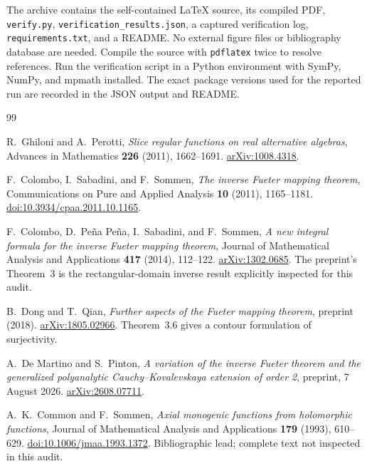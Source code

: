 \documentclass[11pt,a4paper]{article}
\numberwithin{equation}{section}
\theoremstyle{definition}
\theoremstyle{remark}
\begin{document}
The archive contains the self-contained LaTeX source, its compiled PDF,
\texttt{verify.py}, \texttt{verification\_results.json}, a captured
verification log, \texttt{requirements.txt}, and a README. No external
figure files or bibliography database are needed. Compile the source
with \texttt{pdflatex} twice to resolve references. Run the verification
script in a Python environment with SymPy, NumPy, and mpmath installed.
The exact package versions used for the reported run are recorded in
the JSON output and README.

\begin{thebibliography}{99}

R.~Ghiloni and A.~Perotti,
\emph{Slice regular functions on real alternative algebras},
Advances in Mathematics \textbf{226} (2011), 1662--1691.
\href{https://arxiv.org/abs/1008.4318}{arXiv:1008.4318}.

F.~Colombo, I.~Sabadini, and F.~Sommen,
\emph{The inverse Fueter mapping theorem},
Communications on Pure and Applied Analysis \textbf{10} (2011), 1165--1181.
\href{https://doi.org/10.3934/cpaa.2011.10.1165}{doi:10.3934/cpaa.2011.10.1165}.

F.~Colombo, D.~Pe\~na Pe\~na, I.~Sabadini, and F.~Sommen,
\emph{A new integral formula for the inverse Fueter mapping theorem},
Journal of Mathematical Analysis and Applications \textbf{417} (2014), 112--122.
\href{https://arxiv.org/abs/1302.0685}{arXiv:1302.0685}.
The preprint's Theorem~3 is the rectangular-domain inverse result
explicitly inspected for this audit.

B.~Dong and T.~Qian,
\emph{Further aspects of the Fueter mapping theorem},
preprint (2018).
\href{https://arxiv.org/abs/1805.02966}{arXiv:1805.02966}.
Theorem~3.6 gives a contour formulation of surjectivity.

A.~De Martino and S.~Pinton,
\emph{A variation of the inverse Fueter theorem and the generalized
polyanalytic Cauchy--Kovalevskaya extension of order 2},
preprint, 7 August 2026.
\href{https://arxiv.org/abs/2608.07711}{arXiv:2608.07711}.

A.~K.~Common and F.~Sommen,
\emph{Axial monogenic functions from holomorphic functions},
Journal of Mathematical Analysis and Applications \textbf{179} (1993), 610--629.
\href{https://doi.org/10.1006/jmaa.1993.1372}{doi:10.1006/jmaa.1993.1372}.
Bibliographic lead; complete text not inspected in this audit.


\end{thebibliography}
\end{document}
